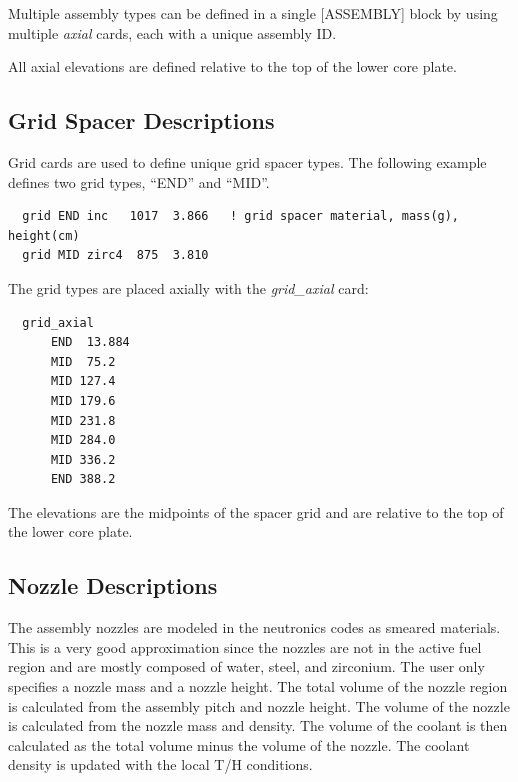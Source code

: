 Multiple assembly types can be defined in a single [ASSEMBLY] block by using
multiple {\it axial} cards, each with a unique assembly ID.

All axial elevations are defined relative to the top of the lower core plate.

\subsection{Grid Spacer Descriptions}

Grid cards are used to define unique grid spacer types.
The following example defines two grid types, ``END'' and ``MID''.
\begin{verbatim}
  grid END inc   1017  3.866   ! grid spacer material, mass(g), height(cm)
  grid MID zirc4  875  3.810
\end{verbatim}

The grid types are placed axially with the {\it grid\_axial} card:
\vfill   %
\begin{verbatim}
  grid_axial
      END  13.884
      MID  75.2
      MID 127.4
      MID 179.6
      MID 231.8
      MID 284.0
      MID 336.2
      END 388.2
\end{verbatim}

The elevations are the midpoints of the spacer grid and are relative to the top of the lower core plate.

\subsection{Nozzle Descriptions}

The assembly nozzles are modeled in the neutronics codes as smeared materials.  This is a very good
approximation since the nozzles are not in the active fuel region and are mostly
composed of water, steel, and zirconium.  The user only specifies a nozzle mass and a nozzle height.
The total volume of the nozzle region is calculated from the assembly pitch and nozzle height.
The volume of the nozzle is calculated from the nozzle mass and density.
The volume of the coolant is then calculated as the total volume minus the volume of the nozzle.
The coolant density is updated with the local T/H conditions.


